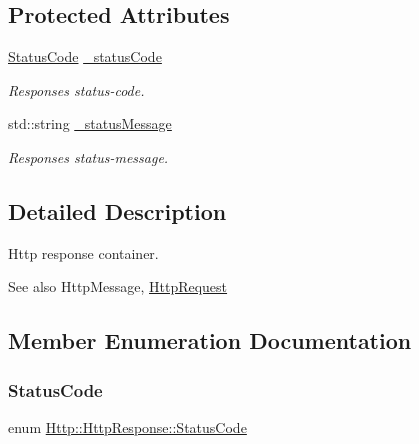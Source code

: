 \subsection*{Protected Attributes}
\begin{DoxyCompactItemize}
\item 
\mbox{\label{classHttp_1_1HttpResponse_a2c2c6385a407c38b11684723c5a7b6ae}} 
\mbox{\hyperlink{classHttp_1_1HttpResponse_a8b4b05c3ebc047a022db989ff475f3b0}{Status\+Code}} \mbox{\hyperlink{classHttp_1_1HttpResponse_a2c2c6385a407c38b11684723c5a7b6ae}{\+\_\+status\+Code}}
\begin{DoxyCompactList}\small\item\em Response\textquotesingle{}s status-\/code. \end{DoxyCompactList}\item 
\mbox{\label{classHttp_1_1HttpResponse_ab18466984714aed42b53eb956a7e35df}} 
std\+::string \mbox{\hyperlink{classHttp_1_1HttpResponse_ab18466984714aed42b53eb956a7e35df}{\+\_\+status\+Message}}
\begin{DoxyCompactList}\small\item\em Response\textquotesingle{}s status-\/message. \end{DoxyCompactList}\end{DoxyCompactItemize}


\subsection{Detailed Description}
Http response container. 

\begin{DoxySeeAlso}{See also}
Http\+Message, \mbox{\hyperlink{classHttp_1_1HttpRequest}{Http\+Request}} 
\end{DoxySeeAlso}


\subsection{Member Enumeration Documentation}
\mbox{\label{classHttp_1_1HttpResponse_a8b4b05c3ebc047a022db989ff475f3b0}} 
\subsubsection{\texorpdfstring{StatusCode}{StatusCode}}
{\footnotesize\ttfamily enum \mbox{\hyperlink{classHttp_1_1HttpResponse_a8b4b05c3ebc047a022db989ff475f3b0}{Http\+::\+Http\+Response\+::\+Status\+Code}}\hspace{0.3cm}{\ttfamily [strong]}}

